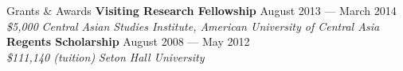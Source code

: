 \documentclass{resume} %
\begin{document}
\begin{minipage}{\textwidth}
\begin{rSection}{Grants \& Awards}
{\bf Visiting Research Fellowship} \hfill {August 2013 --- March 2014} \\ 
{\em \$5,000} \hfill {\em Central Asian Studies Institute, American University of Central Asia} \\


{\bf Regents Scholarship} \hfill {August 2008 --- May 2012} \\ 
{\em \$111,140 (tuition)} \hfill {\em Seton Hall University} \\



\end{rSection}
\end{minipage}



\end{document}
